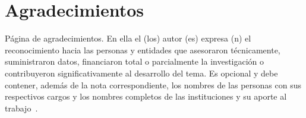
\section*{Agradecimientos}

Página de agradecimientos. En ella el (los) autor (es) expresa (n) el reconocimiento hacia las personas y entidades que asesoraron técnicamente, suministraron datos, financiaron total o parcialmente la investigación o contribuyeron significativamente al desarrollo del tema. Es opcional y debe contener, además de la nota correspondiente, los nombres de las personas con sus respectivos cargos y los nombres completos de las instituciones y su aporte al trabajo~\cite{NTC14862008}.


\newpage
